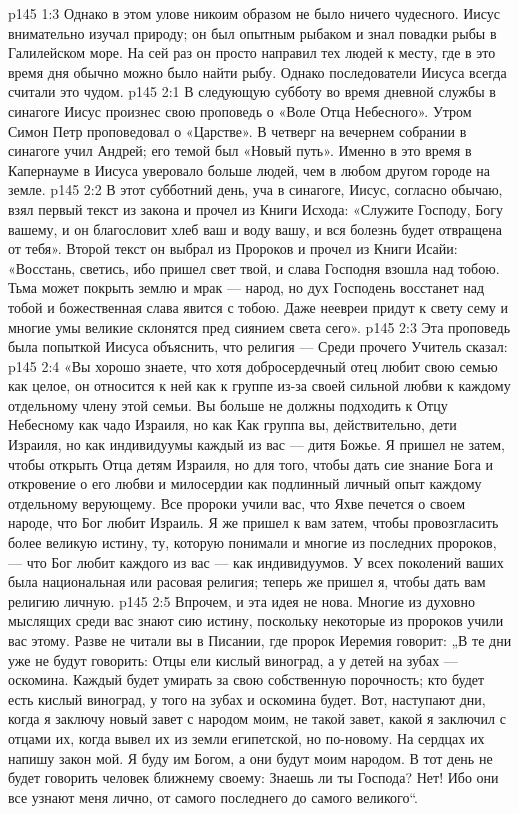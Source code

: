 \vs p145 1:3 Однако в этом улове никоим образом не было ничего чудесного. Иисус внимательно изучал природу; он был опытным рыбаком и знал повадки рыбы в Галилейском море. На сей раз он просто направил тех людей к месту, где в это время дня обычно можно было найти рыбу. Однако последователи Иисуса всегда считали это чудом.
\vs p145 2:1 В следующую субботу во время дневной службы в синагоге Иисус произнес свою проповедь о «Воле Отца Небесного». Утром Симон Петр проповедовал о «Царстве». В четверг на вечернем собрании в синагоге учил Андрей; его темой был «Новый путь». Именно в это время в Капернауме в Иисуса уверовало больше людей, чем в любом другом городе на земле.
\vs p145 2:2 В этот субботний день, уча в синагоге, Иисус, согласно обычаю, взял первый текст из закона и прочел из Книги Исхода: «Служите Господу, Богу вашему, и он благословит хлеб ваш и воду вашу, и вся болезнь будет отвращена от тебя». Второй текст он выбрал из Пророков и прочел из Книги Исайи: «Восстань, светись, ибо пришел свет твой, и слава Господня взошла над тобою. Тьма может покрыть землю и мрак --- народ, но дух Господень восстанет над тобой и божественная слава явится с тобою. Даже неевреи придут к свету сему и многие умы великие склонятся пред сиянием света сего».
\vs p145 2:3 Эта проповедь была попыткой Иисуса объяснить, что религия ---  Среди прочего Учитель сказал:
\vs p145 2:4 «Вы хорошо знаете, что хотя добросердечный отец любит свою семью как целое, он относится к ней как к группе из\hyp{}за своей сильной любви к каждому отдельному члену этой семьи. Вы больше не должны подходить к Отцу Небесному как чадо Израиля, но как  Как группа вы, действительно, дети Израиля, но как индивидуумы каждый из вас --- дитя Божье. Я пришел не затем, чтобы открыть Отца детям Израиля, но для того, чтобы дать сие знание Бога и откровение о его любви и милосердии как подлинный личный опыт каждому отдельному верующему. Все пророки учили вас, что Яхве печется о своем народе, что Бог любит Израиль. Я же пришел к вам затем, чтобы провозгласить более великую истину, ту, которую понимали и многие из последних пророков, --- что Бог любит  каждого из вас --- как индивидуумов. У всех поколений ваших была национальная или расовая религия; теперь же пришел я, чтобы дать вам религию личную.
\vs p145 2:5 Впрочем, и эта идея не нова. Многие из духовно мыслящих среди вас знают сию истину, поскольку некоторые из пророков учили вас этому. Разве не читали вы в Писании, где пророк Иеремия говорит: „В те дни уже не будут говорить: Отцы ели кислый виноград, а у детей на зубах --- оскомина. Каждый будет умирать за свою собственную порочность; кто будет есть кислый виноград, у того на зубах и оскомина будет. Вот, наступают дни, когда я заключу новый завет с народом моим, не такой завет, какой я заключил с отцами их, когда вывел их из земли египетской, но по\hyp{}новому. На сердцах их напишу закон мой. Я буду им Богом, а они будут моим народом. В тот день не будет говорить человек ближнему своему: Знаешь ли ты Господа? Нет! Ибо они все узнают меня лично, от самого последнего до самого великого“.
